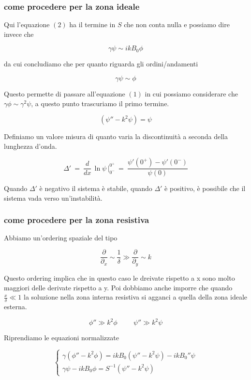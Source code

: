 %
%
\subsubsection{come procedere per la zona ideale}  

Qui l'equazione $(2)$ ha il termine in $S$ che non conta nulla e possiamo dire invece che  

\[\gamma\psi\sim ikB_0\phi\] 

da cui concludiamo che per quanto riguarda gli ordini/andamenti 

\[\gamma\psi\sim\phi\]

Questo permette di passare all'equazione $(1)$ in cui possiamo considerare che $\gamma\phi\sim\gamma^2\psi$, a questo punto trascuriamo il primo termine.
 
\[(\psi''-k^2\psi)=\psi\] 

Definiamo un valore misura di quanto varia la discontinuità  a seconda della lunghezza d'onda.

\[\Delta '\ =\ \frac{d}{dx}\,\ln\psi\,\bigg|_{0^-}^{0^+}\ =\ \frac{\psi'(0^+)-\psi'(0^-)}{\psi(0)}\]  

Quando $\Delta'$ è negativo il sistema è stabile, quando $\Delta'$ è positivo, è possibile che il sistema vada verso un'instabilità.

%
%
\subsubsection{come procedere per la zona resistiva} 

Abbiamo un'ordering spaziale del tipo 

\[\frac{\partial}{\partial_x}\sim\frac{1}{\delta}\gg\frac{\partial}{\partial_y}\sim k\]

Questo ordering implica che in questo caso le dreivate rispetto a x sono molto maggiori delle derivate rispetto a y. Poi dobbiamo anche imporre che quando $\frac{x}{\delta}\ll1$ la soluzione nella zona interna resistiva si agganci a quella della zona ideale esterna.

\[\phi''\gg k^2\phi\hspace{1cm}\psi''\gg k^2\psi\] 

Riprendiamo le equazioni normalizzate 

\[\begin{cases}
	\gamma(\phi''-k^2\phi)=ikB_0(\psi''-k^2\psi)-ikB_0''\psi\\
	\gamma\psi-ikB_0\phi=S^{-1}(\psi''-k^2\psi)
\end{cases}\] 

